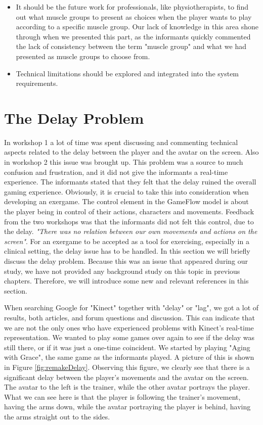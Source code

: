 \begin{itemize}
\item It should be the future work for professionals, like physiotherapists, to find out what muscle groups to present as choices when the player wants to play according to a specific muscle group. Our lack of knowledge in this area shone through when we presented this part, as the informants quickly commented the lack of consistency between the term "muscle group" and what we had presented as muscle groups to choose from. 
\item Technical limitations should be explored and integrated into the system requirements.
\end{itemize}
 
\section{The Delay Problem}
\label{sec:delay}
In workshop 1 a lot of time was spent discussing and commenting technical aspects related to the delay between the player and the avatar on the screen.  Also in workshop 2 this issue was brought up. This problem was a source to much confusion and frustration, and it did not give the informants a real-time experience. The informants stated that they felt that the delay ruined the overall gaming experience. Obviously, it is crucial to take this into consideration when developing an exergame. The control element in the GameFlow model \cite{sweetser} is about the player being in control of their actions, characters and movements. Feedback from the two workshops was that the informants did not felt this control, due to the delay. \emph{"There was no relation between our own movements and actions on the screen"}. For an exergame to be accepted as a tool for exercising, especially in a clinical setting, the delay issue has to be handled. In this section we will briefly discuss the delay problem. Because this was an issue that appeared during our study, we have not provided any background study on this topic in previous chapters. Therefore, we will introduce some new and relevant references in this section.

When searching Google for "Kinect" together with "delay" or "lag", we got a lot of results, both articles, and forum questions and discussion. This can indicate that we are not the only ones who have experienced problems with Kinect's real-time representation. We wanted to play some games over again to see if the delay was still there, or if it was just a one-time coincident. We started by playing "Aging with Grace", the same game as the informants played. A picture of this is shown in Figure \ref{fig:remakeDelay}. Observing this figure, we clearly see that there is a significant delay between the player's movements and the avatar on the screen. The avatar to the left is the trainer, while the other avatar portrays the player. What we can see here is that the player is following the trainer's movement, having the arms down, while the avatar portraying the player is behind, having the arms straight out to the sides.

